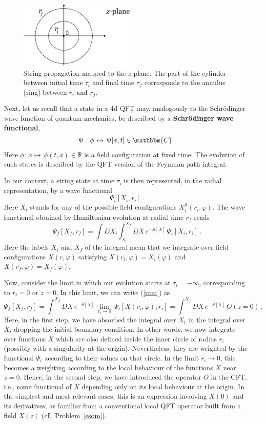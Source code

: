 \documentclass[12pt]{article}
\newcommand{\be}{\begin{equation}}
\newcommand{\ee}{\end{equation}}
\newcommand{\ol}{\overline}
\numberwithin{equation}{section}
\begin{document}
\begin{figure}[ht]
\begin{center} 
\includegraphics[width=6cm]{soc.png}
\caption{String propagation mapped to the $z$-plane. The part of the cylinder between initial time $\tau_i$ and final time $\tau_f$ corresponds to the annulus (ring) between $r_i$ and $r_f$.}
\label{soc} 
\end{center}
\end{figure}

Next, let us recall that a state in a 4d QFT may, analogously to the Schr\"odinger wave function of quantum mechanics, be described by a {\bf Schr\"odinger wave functional},
\be
\Psi:\,\phi\,\mapsto\, \Psi[\phi,t]\in\mathbbm{C}\,.
\ee
Here $\phi:\,\ol{x}\mapsto\,\phi(t,\ol{x})\in\mathbb{R}$ is a field configuration at fixed time. The evolution of such states is described by the QFT version of the Feynman path integral.

In our context, a string state at time $\tau_i$ is then represented, in the radial representation, by a wave functional
\be
\Psi_i[X_i,r_i]\,.
\ee
Here $X_i$ stands for any of the possible field configurations $X_i^\mu(r_i,\varphi)$. The wave functional obtained by Hamiltonian evolution at radial time $r_f$ reads
\be
\Psi_f[X_f,r_f]=\int DX_i \int_{X_i}^{X_f} DX\,e^{-S[X]}\,\Psi_i[X_i,r_i]\,.
\label{ram}
\ee
Here the labels $X_i$ and $X_f$ of the integral mean that we integrate over field configurations $X(r,\varphi)$ satisfying $X(r_i,\varphi)=X_i(\varphi)$ and $X(r_f,\varphi)=X_f(\varphi)$.

Now, consider the limit in which our evolution starts at $\tau_i=-\infty$, corresponding to $r_i=0$ or $z=0$. In this limit, we can write 
(\ref{ram}) as
\be
\Psi_f[X_f,r_f]=\int^{X_f} DX\,e^{-S[X]}\,\lim_{r_i\to 0}\,\Psi_i[X(r_i,\varphi),r_i]=\int^{X_f} DX\,e^{-S[X]}\,O(z=0)\,.\label{ram1}
\ee
Here, in the first step, we have absorbed the integral over $X_i$ in the integral over $X$, dropping the initial boundary condition. In other words, we now integrate  over functions $X$ which are also defined inside the inner circle of radius $r_i$ (possibly with a singularity at the origin). Nevertheless, they are weighted by the functional $\Psi_i$ according to their values on that circle. In the limit $r_i\to 0$, this becomes a weighting according to the local behaviour of the functions $X$ near $z=0$. Hence, in the second step, we have introduced the operator $O$ in the CFT, i.e., some functional of $X$ depending only on its local behaviour at the origin. In the simplest and most relevant cases, this is an expression involving $X(0)$ and its derivatives, as familiar from a conventional local QFT operator built from a field $X(z)$ (cf.~Problem~\ref{esom}).
\end{document}
